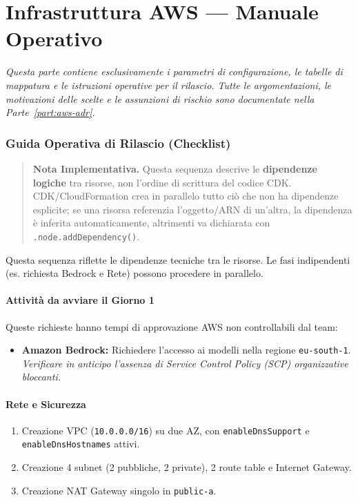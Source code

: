 \documentclass[11pt,a4paper]{article}
\begin{document}
\part{Infrastruttura AWS --- Manuale Operativo}
\label{part:aws-manuale}

\emph{Questa parte contiene esclusivamente i parametri di configurazione, le tabelle di mappatura e le istruzioni operative per il rilascio. Tutte le argomentazioni, le motivazioni delle scelte e le assunzioni di rischio sono documentate nella Parte~\ref{part:aws-adr}.}

\section{Guida Operativa di Rilascio (Checklist)}
\label{sec:aws-checklist}

\begin{quote}
\textbf{Nota Implementativa.} Questa sequenza descrive le \textbf{dipendenze logiche} tra risorse, non l'ordine di scrittura del codice CDK. CDK/CloudFormation crea in parallelo tutto ciò che non ha dipendenze esplicite; se una risorsa referenzia l'oggetto/ARN di un'altra, la dipendenza è inferita automaticamente, altrimenti va dichiarata con \texttt{.node.addDependency()}.
\end{quote}

Questa sequenza riflette le dipendenze tecniche tra le risorse. Le fasi indipendenti (es. richiesta Bedrock e Rete) possono procedere in parallelo.

\subsection{Attività da avviare il Giorno 1}

Queste richieste hanno tempi di approvazione AWS non controllabili dal team:
\begin{itemize}
    \item \textbf{Amazon Bedrock:} Richiedere l'accesso ai modelli nella regione \texttt{eu-south-1}. \emph{Verificare in anticipo l'assenza di Service Control Policy (SCP) organizzative bloccanti.}
\end{itemize}

\subsection{Rete e Sicurezza}

\begin{enumerate}
    \item Creazione VPC (\texttt{10.0.0.0/16}) su due AZ, con \texttt{enableDnsSupport} e \texttt{enableDnsHostnames} attivi.
    \item Creazione 4 subnet (2 pubbliche, 2 private), 2 route table e Internet Gateway.
    \item Creazione NAT Gateway singolo in \texttt{public-a}.
\end{enumerate}
\end{document}
